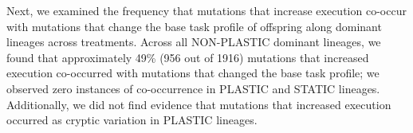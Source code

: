 Next, we examined the frequency that mutations that increase  execution co-occur with mutations that change the base task profile of offspring along dominant lineages across treatments.
Across all NON-PLASTIC dominant lineages, we found that approximately 49\% (956 out of 1916) mutations that increased  execution co-occurred with mutations that changed the base task profile; we observed zero instances of co-occurrence in PLASTIC and STATIC lineages.
Additionally, we did not find evidence that mutations that increased  execution occurred as cryptic variation in PLASTIC lineages.



